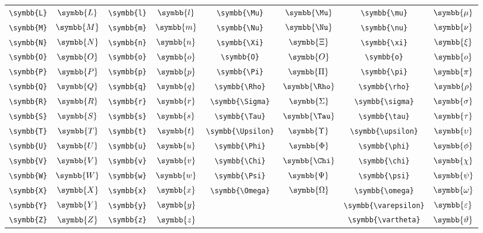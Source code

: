 \begin{longtable}{cccccccc}
    \verb|\symbb{L}| & \(\symbb{L}\) & \verb|\symbb{l}| & \(\symbb{l}\) & \verb|\symbb{\Mu}|      & \(\symbb{\Mu}\)      & \verb|\symbb{\mu}|         & \(\symbb{\mu}\)         \\
    \verb|\symbb{M}| & \(\symbb{M}\) & \verb|\symbb{m}| & \(\symbb{m}\) & \verb|\symbb{\Nu}|      & \(\symbb{\Nu}\)      & \verb|\symbb{\nu}|         & \(\symbb{\nu}\)         \\
    \verb|\symbb{N}| & \(\symbb{N}\) & \verb|\symbb{n}| & \(\symbb{n}\) & \verb|\symbb{\Xi}|      & \(\symbb{\Xi}\)      & \verb|\symbb{\xi}|         & \(\symbb{\xi}\)         \\
    \verb|\symbb{O}| & \(\symbb{O}\) & \verb|\symbb{o}| & \(\symbb{o}\) & \verb|\symbb{O}|        & \(\symbb{O}\)        & \verb|\symbb{o}|           & \(\symbb{o}\)           \\
    \verb|\symbb{P}| & \(\symbb{P}\) & \verb|\symbb{p}| & \(\symbb{p}\) & \verb|\symbb{\Pi}|      & \(\symbb{\Pi}\)      & \verb|\symbb{\pi}|         & \(\symbb{\pi}\)         \\
    \verb|\symbb{Q}| & \(\symbb{Q}\) & \verb|\symbb{q}| & \(\symbb{q}\) & \verb|\symbb{\Rho}|     & \(\symbb{\Rho}\)     & \verb|\symbb{\rho}|        & \(\symbb{\rho}\)        \\
    \verb|\symbb{R}| & \(\symbb{R}\) & \verb|\symbb{r}| & \(\symbb{r}\) & \verb|\symbb{\Sigma}|   & \(\symbb{\Sigma}\)   & \verb|\symbb{\sigma}|      & \(\symbb{\sigma}\)      \\
    \verb|\symbb{S}| & \(\symbb{S}\) & \verb|\symbb{s}| & \(\symbb{s}\) & \verb|\symbb{\Tau}|     & \(\symbb{\Tau}\)     & \verb|\symbb{\tau}|        & \(\symbb{\tau}\)        \\
    \verb|\symbb{T}| & \(\symbb{T}\) & \verb|\symbb{t}| & \(\symbb{t}\) & \verb|\symbb{\Upsilon}| & \(\symbb{\Upsilon}\) & \verb|\symbb{\upsilon}|    & \(\symbb{\upsilon}\)    \\
    \verb|\symbb{U}| & \(\symbb{U}\) & \verb|\symbb{u}| & \(\symbb{u}\) & \verb|\symbb{\Phi}|     & \(\symbb{\Phi}\)     & \verb|\symbb{\phi}|        & \(\symbb{\phi}\)        \\
    \verb|\symbb{V}| & \(\symbb{V}\) & \verb|\symbb{v}| & \(\symbb{v}\) & \verb|\symbb{\Chi}|     & \(\symbb{\Chi}\)     & \verb|\symbb{\chi}|        & \(\symbb{\chi}\)        \\
    \verb|\symbb{W}| & \(\symbb{W}\) & \verb|\symbb{w}| & \(\symbb{w}\) & \verb|\symbb{\Psi}|     & \(\symbb{\Psi}\)     & \verb|\symbb{\psi}|        & \(\symbb{\psi}\)        \\
    \verb|\symbb{X}| & \(\symbb{X}\) & \verb|\symbb{x}| & \(\symbb{x}\) & \verb|\symbb{\Omega}|   & \(\symbb{\Omega}\)   & \verb|\symbb{\omega}|      & \(\symbb{\omega}\)      \\
    \verb|\symbb{Y}| & \(\symbb{Y}\) & \verb|\symbb{y}| & \(\symbb{y}\) &                         &                      & \verb|\symbb{\varepsilon}| & \(\symbb{\varepsilon}\) \\
    \verb|\symbb{Z}| & \(\symbb{Z}\) & \verb|\symbb{z}| & \(\symbb{z}\) &                         &                      & \verb|\symbb{\vartheta}|   & \(\symbb{\vartheta}\)   \\
    \bottomrule
\end{longtable}
